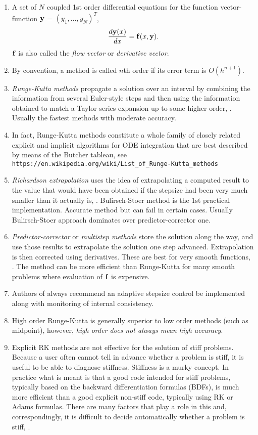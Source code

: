 \documentclass[]{article}
\begin{document}
\begin{enumerate}
\item A set of $N$ coupled 1st order differential equations for the function vector-function ${\bf y}$ = $(y_1, \ldots, y_N)^T$,
$$
\frac{d {\bf y}(x)}{d x} = {\bf f}(x, {\bf y}).
$$
${\bf f}$ is also called the \textit{flow vector} or \textit{derivative vector}.
\item By convention, a method is called $n$th order if its error term is $O(h^{n+1})$.
\item \textit{Runge-Kutta methods} propagate a solution over an interval by combining the information from several Euler-style steps and then using the information obtained to match a Taylor series expansion up to some higher order, \cite{NR07}. Usually the fastest methods with moderate accuracy.
\item In fact, Runge-Kutta methods constitute a whole family of closely related explicit and implicit algorithms for ODE integration that are best described by means of the Butcher tableau, see \\ \verb|https://en.wikipedia.org/wiki/List_of_Runge-Kutta_methods|
\item \textit{Richardson extrapolation} uses the idea of extrapolating a computed result to the value that would have been obtained if the stepsize had been very much smaller than it actually is, \cite{NR07}. Bulirsch-Stoer method is the 1st practical implementation. Accurate method but can fail in certain cases. Usually Bulirsch-Stoer approach dominates over predictor-corrector one.
\item \textit{Predictor-corrector} or \textit{multistep methods} store the solution along the way, and use those results to extrapolate the solution one step advanced. Extrapolation is then corrected using derivatives. These are best for very smooth functions, \cite{NR07}. The method can be more efficient than Runge-Kutta for many smooth problems where evaluation of ${\bf f}$ is expensive.
\item Authors of \cite{NR07} always recommend an adaptive stepsize control be implemented along with monitoring of internal consistency.
\item High order Runge-Kutta is generally superior to low order methods (such as midpoint), however, \textit{high order does not always mean high accuracy}.
\item Explicit RK methods are not effective for the solution of stiff problems. Because a user often cannot tell in advance whether a problem is stiff, it is useful to be able to diagnose stiffness. Stiffness is a murky concept. In practice what is meant is that a good code intended for stiff problems, typically based on the backward differentiation formulas (BDFs), is much more efficient than a good explicit non-stiff code, typically using RK or Adams formulas. There are many factors that play a role in this and, correspondingly, it is difficult to decide automatically whether a problem is stiff, \cite{Shampine77, Shampine99}.
\end{enumerate}
\end{document}

